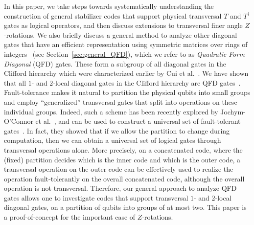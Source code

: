 \documentclass[twoside,romanappendices]{IEEEtran}
\newcommand{\red}[1]{{\color{red}#1}}
\begin{document}

In this paper, we take steps towards systematically understanding the construction of general stabilizer codes that support physical transversal $T$ and $T^{\dagger}$ gates as logical operators, and then discuss extensions to transversal finer angle $Z$-rotations.
We also briefly discuss a general method to analyze other diagonal gates that have an efficient representation using symmetric matrices over rings of integers~\cite{Rengaswamy-pra19} (see Section~\ref{sec:general_QFD}), which we refer to as \emph{Quadratic Form Diagonal} (QFD) gates.
These form a subgroup of all diagonal gates in the Clifford hierarchy which were characterized earlier by Cui et al.~\cite{Cui-physreva17}.
We have shown that all $1$- and $2$-local diagonal gates in the Clifford hierarchy are QFD gates~\cite{Rengaswamy-pra19}.
Fault-tolerance makes it natural to partition the physical qubits into small groups and employ ``generalized'' transversal gates that split into operations on these individual groups.
Indeed, such a scheme has been recently explored by Jochym-O'Connor et al.~\cite{JochymOconnor-prx17}, and can be used to construct a universal set of fault-tolerant gates~\cite{JochymOconnor-prl14}.
In fact, they showed that if we allow the partition to change during computation, then we can obtain a universal set of logical gates through transversal operations alone.
More precisely, on a concatenated code, where the (fixed) partition decides which is the inner code and which is the outer code, a transversal operation on the outer code can be effectively used to realize the operation fault-tolerantly on the overall concatenated code, although the overall operation is not transversal.
Therefore, our general approach to analyze QFD gates allows one to investigate codes that support transversal $1$- and $2$-local diagonal gates, on a partition of qubits into groups of at most two.
This paper is a proof-of-concept for the important case of $Z$-rotations.
\end{document}
